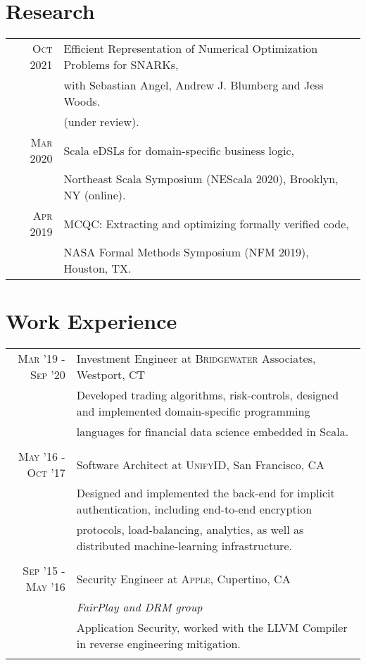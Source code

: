 \documentclass[lettersize,11pt]{article}
\begin{document}
\section{Research}
\begin{tabular}{rl}
    \textsc{Oct} 2021 & Efficient Representation of Numerical Optimization Problems for SNARKs, \\
                      & with Sebastian Angel, Andrew J. Blumberg and Jess Woods. \\
                      & (under review).  \\
    \textsc{Mar} 2020 & Scala eDSLs for domain-specific business logic, \\
                      & Northeast Scala Symposium (NEScala 2020), Brooklyn, NY (online). \\
    \textsc{Apr} 2019 & MCQC: Extracting and optimizing formally verified code, \\
                      & NASA Formal Methods Symposium (NFM 2019), Houston, TX. \\
\end{tabular}

\section{Work Experience}
\begin{tabular}{rl}
\textsc{Mar} '19 - \textsc{Sep} '20 & Investment Engineer at \textsc{Bridgewater} Associates, Westport, CT\\
&\footnotesize{Developed trading algorithms, risk-controls, designed and implemented domain-specific programming}\\
&\footnotesize{languages for financial data science embedded in Scala.}\\\multicolumn{2}{c}{}\\
\textsc{May} '16 - \textsc{Oct} '17 & Software Architect at \textsc{UnifyID}, San Francisco, CA\\
&\footnotesize{Designed and implemented the back-end for implicit authentication, including end-to-end encryption}\\
&\footnotesize{protocols, load-balancing, analytics, as well as distributed machine-learning infrastructure.}\\\multicolumn{2}{c}{}\\
\textsc{Sep} '15 - \textsc{May} '16 & Security Engineer at \textsc{Apple}, Cupertino, CA \\&\emph{FairPlay and DRM group}\\
&\footnotesize{Application Security, worked with the LLVM Compiler in reverse engineering mitigation.}\\\multicolumn{2}{c}{}\\
\end{tabular}
\end{document}
